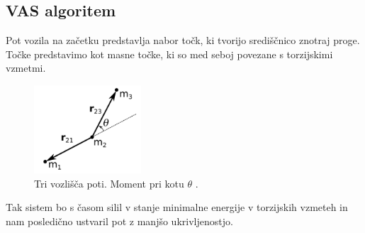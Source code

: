 \subsection{VAS algoritem}

Pot vozila na začetku predstavlja nabor točk, ki tvorijo središčnico znotraj proge. Točke predstavimo kot masne točke, ki so med seboj povezane s torzijskimi vzmetmi.

\begin{figure}[H]
	\centering
	\includegraphics[width=4cm]{pic/slika5.png}
	\caption{Tri vozlišča poti. Moment pri kotu $\theta$ \cite{vir9}.}
	\label{fig:slika}
\end{figure}

Tak sistem bo s časom silil v stanje minimalne energije v torzijskih vzmeteh in nam posledično ustvaril pot z manjšo ukrivljenostjo.

